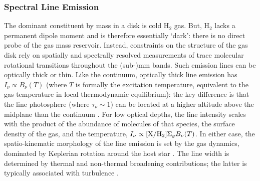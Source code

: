\documentclass[a4paper]{ar-1col}
\begin{document}
\subsubsection{Spectral Line Emission}
The dominant constituent by mass in a disk is cold H$_2$ gas.  But, H$_2$ lacks a permanent dipole moment and is therefore essentially `dark': there is no direct probe of the gas mass reservoir.  Instead, constraints on the structure of the gas disk rely on spatially and spectrally resolved measurements of trace molecular rotational transitions throughout the (sub-)mm bands.  Such emission lines can be optically thick or thin.  Like the continuum, optically thick line emission has $I_\nu \propto B_\nu(T)$ (where $T$ is formally the excitation temperature, equivalent to the gas temperature in local thermodynamic equilibrium): the key difference is that the line photosphere (where $\tau_\nu \sim 1$) can be located at a higher altitude above the midplane than the continuum \citep{beckwith93}.  For low optical depths, the line intensity scales with the product of the abundance of molecules of that species, the surface density of the gas, and the temperature, $I_\nu \propto [{\rm X}/{\rm H}_2] \Sigma_g B_\nu(T)$.  In either case, the spatio-kinematic morphology of the line emission is set by the gas dynamics, dominated by Keplerian rotation around the host star \citep{marsh92,koerner93}.  The line width is determined by thermal and non-thermal broadening contributions; the latter is typically associated with turbulence \citep{hughes11}.         
\end{document}
